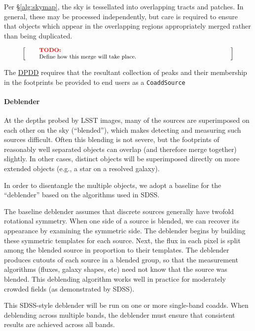 \documentclass[12pt]{article}
\newcommand{\ds}[2]{{\color{blue} \href{https://docushare.lsstcorp.org/docushare/dsweb/Get/#1}{#2}}\xspace}
\newcommand{\DPDD}{\ds{LSE-163}{DPDD}}
\newenvironment{note}[1][Note]
{
  \begin{displaymath}
    \left[ \qquad
    \begin{minipage}[h]{.75\linewidth}
      \color{red} \footnotesize
      \textbf{#1:} \newline
      \color{black}
}
{
    \end{minipage}
    \normalsize
    \qquad \right]
  \end{displaymath}
}
\begin{document}
Per \S\ref{alg:skymap}, the sky is tessellated into overlapping tracts and patches. In general, these may be processed independently, but care is required to ensure that objects which appear in the overlapping regions appropriately merged rather than being duplicated.

\begin{note}[TODO]
Define how this merge will take place.
\end{note}

The \DPDD{} requires that the resultant collection of peaks and their
membership in the footprints be provided to end users as a \texttt{CoaddSource}

\paragraph{Deblender}
\label{alg:deblender}

At the depths probed by LSST images, many of the sources are superimposed on each other on the sky (``blended''), which makes detecting and measuring such sources difficult.  Often this blending is not severe, but the footprints of reasonably well separated objects can overlap (and therefore merge together) slightly.  In other cases, distinct objects will be superimposed directly on more extended objects (e.g., a star on a resolved galaxy). %

In order to disentangle the multiple objects, we adopt a baseline for the ``deblender'' based on the algorithms used in SDSS.

The baseline deblender assumes that discrete sources generally have twofold
rotational symmetry.  When one side of a source is blended, we can
recover its appearance by examining the symmetric side.  The deblender
begins by building these symmetric templates for each source.  Next,
the flux in each pixel is split among the blended source in proportion
to their templates.  The deblender produces cutouts of each
source in a blended group, so that the measurement algorithms (fluxes,
galaxy shapes, etc) need not know that the source was blended. This deblending algorithm works well in practice for moderately crowded fields (as demonstrated by SDSS).

This SDSS-style deblender will be run on one or more single-band coadds. When deblending across multiple bands, the deblender must ensure that consistent results are achieved across all bands.
\end{document}
